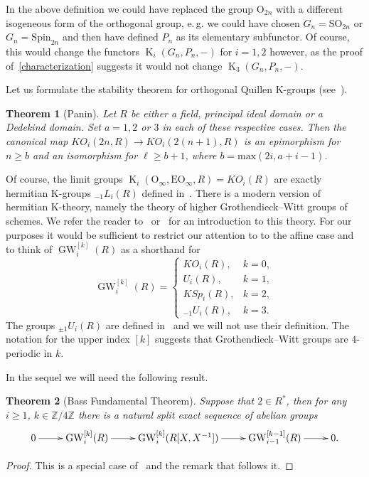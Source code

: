 \documentclass[oneside, 8pt]{amsart}
\newtheorem{theorem}{Theorem}
\theoremstyle{remark}
\theoremstyle{definition}
\DeclareMathOperator{\K}{K}
\DeclareMathOperator{\GW}{GW}
\newcommand{\ZZ}{\mathbb{Z}}
\numberwithin{equation}{section}
\begin{document}
In the above definition we could have replaced the group $\mathrm{O}_{2n}$ with a different isogeneous form of the orthogonal group, e.\,g. 
 we could have chosen $G_n = \mathrm{SO}_{2n}$ or $G_n = \mathrm{Spin}_{2n}$ and then have defined $P_n$ as its elementary subfunctor.
Of course, this would change the functors $\K_i(G_n, P_n, -)$ for $i=1,2$ however, as the proof of~\cref{characterization} suggests
 it would not change $\K_3(G_n, P_n, -)$.

Let us formulate the stability theorem for orthogonal Quillen K-groups (see~\cite[Theorem~9.4]{Pa89}).
\begin{theorem}[Panin] \label{lem:Panin-stability}
 Let $R$ be either a field, principal ideal domain or a Dedekind domain. Set $a = 1,2$ or $3$ in each of these respective cases.
 Then the canonical map $KO_i(2n, R) \to KO_i(2(n+1), R)$ is an epimorphism for $n \geq b$ 
 and an isomorphism for $\ell \geq b + 1$, where $b = \mathrm{max}(2i, a+i-1)$. \end{theorem}
 
Of course, the limit groups $\K_i(\mathrm{O}_\infty, \mathrm{EO}_\infty, R) = KO_i(R)$ are exactly hermitian K-groups ${}_{-1}\!L_i(R)$ defined in~\cite{Ka80}.
There is a modern version of hermitian K-theory, namely the theory of higher Grothendieck--Witt groups of schemes.
We refer the reader to~\cite[\S~2]{AF17} or~\cite[\S~2]{FRS12} for an introduction to this theory.
For our purposes it would be sufficient to restrict our attention to to the affine case and to think of $\GW_i^{[k]}(R)$ as a shorthand for
\begin{equation}
 \GW_i^{[k]}(R) = \left\{\begin{array}{ll} KO_i(R), & k = 0, \\ U_i(R), & k = 1, \\ KSp_i(R), & k = 2, \\ {}_{-1}\!U_i(R), & k = 3. \end{array}\right.
\end{equation} %
The groups ${}_{\pm 1}\!U_i(R)$ are defined in~\cite{Ka80} and we will not use their definition.
The notation for the upper index $[k]$ suggests that Grothendieck--Witt groups are $4$-periodic in $k$.

In the sequel we will need the following result.
\begin{theorem}[Bass Fundamental Theorem]\label{bass-ft} Suppose that $2 \in R^*$, then for any $i\geq 1$, $k\in \ZZ/4\ZZ$ there is a natural split exact sequence of abelian groups
 \[ \xymatrix{ 0 \ar[r] & \GW_i^{[k]}(R) \ar[r] & \GW_i^{[k]}(R[X, X^{-1}]) \ar[r]  & \GW_{i-1}^{[k-1]}(R) \ar[r] & 0.} \] \end{theorem}
\begin{proof} This is a special case of~\cite[Theorem~9.13]{Sch16} and the remark that follows it. \end{proof}
\end{document}
